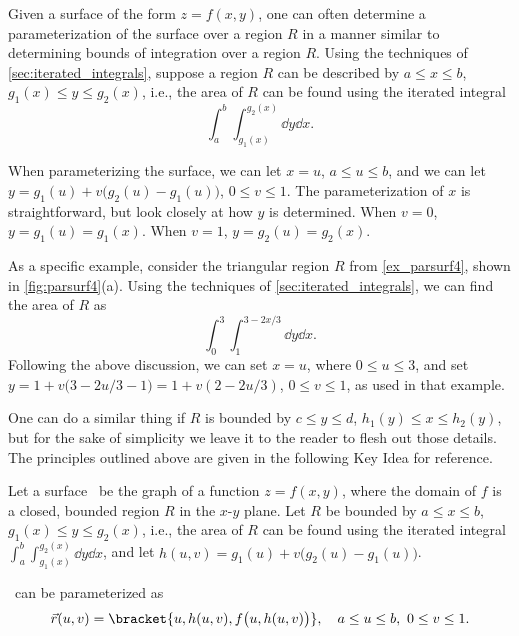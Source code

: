 Given a surface of the form $z=f(x,y)$, one can often determine a parameterization of the surface over a region $R$ in a manner similar to determining bounds of integration over a region $R$. Using the techniques of \autoref{sec:iterated_integrals}, suppose a region $R$ can be described by $a\leq x\leq b$, $g_1(x) \leq y\leq g_2(x)$, i.e., the area of $R$ can be found using the iterated integral
\[\int_a^b\int_{g_1(x)}^{g_2(x)}\dd y\dd x.\]

When parameterizing the surface, we can let $x=u$, $a\leq u\leq b$, and we can let $y = g_1(u)+v\bigl(g_2(u)-g_1(u)\bigr)$, $0\leq v\leq 1$. The parameterization of $x$ is straightforward, but look closely at how $y$ is determined. When $v=0$, $y=g_1(u) = g_1(x)$. When $v=1$, $y= g_2(u)=g_2(x)$. 

As a specific example, consider the triangular region $R$ from \autoref{ex_parsurf4}, shown in \autoref{fig:parsurf4}(a). Using the techniques of \autoref{sec:iterated_integrals}, we can find the area of $R$ as
\[\int_0^3\int_1^{3-2x/3}\dd y\dd x.\]
Following the above discussion, we can set $x=u$, where $0\leq u\leq 3$, and set $y = 1+ v\bigl(3-2u/3-1\bigr) = 1+v(2-2u/3)$, $0\leq v\leq 1$, as used in that example.

One can do a similar thing if $R$ is bounded by $c\leq y\leq d$, $h_1(y)\leq x\leq h_2(y)$, but for the sake of simplicity we leave it to the reader to flesh out those details. The principles outlined above are given in the following Key Idea for reference.

\begin{keyidea}\label{idea:parameterizing_surfaces}%
Let a surface \surfaceS\ be the graph of a function $z=f(x,y)$, where the domain of $f$ is  a closed, bounded region $R$ in the $x$-$y$ plane. 
Let $R$ be bounded by $a\leq x\leq b$, $g_1(x)\leq y\leq g_2(x)$, i.e., the area of $R$ can be found using the iterated integral $\int_a^b\int_{g_1(x)}^{g_2(x)}\dd y\dd x$, and let $h(u,v) = g_1(u)+v\bigl(g_2(u)-g_1(u)\bigr)$. 

\surfaceS\ can be parameterized as 
\[
\vec r(u,v)
= \bracket{u, h(u,v), f\bigl(u,h(u,v)\bigr)},\quad a\leq u\leq b,\ 0\leq v\leq 1.
\]
\end{keyidea}

